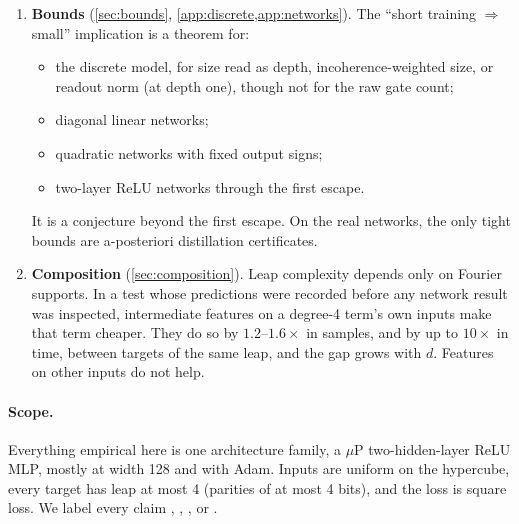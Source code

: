 \begin{enumerate}
\item \textbf{Bounds} (\cref{sec:bounds}, \cref{app:discrete,app:networks}). The ``short training $\Rightarrow$ small'' implication is a theorem for:
  \begin{itemize}
  \item the discrete model, for size read as depth, incoherence-weighted size, or readout norm (at depth one), though not for the raw gate count;
  \item diagonal linear networks;
  \item quadratic networks with fixed output signs;
  \item two-layer ReLU networks through the first escape.
  \end{itemize}
  It is a conjecture beyond the first escape. On the real networks, the only tight bounds are a-posteriori distillation certificates.
\item \textbf{Composition} (\cref{sec:composition}). Leap complexity depends only on Fourier supports. In a test whose predictions were recorded before any network result was inspected, intermediate features on a degree-4 term's own inputs make that term cheaper. They do so by $1.2$–$1.6\times$ in samples, and by up to $10\times$ in time, between targets of the same leap, and the gap grows with $d$. Features on other inputs do not help.
\end{enumerate}

\paragraph{Scope.} Everything empirical here is one architecture family, a $\mu$P two-hidden-layer ReLU MLP, mostly at width 128 and with Adam. Inputs are uniform on the hypercube, every target has leap at most 4 (parities of at most 4 bits), and the loss is square loss. We label every claim , , ,  or .
